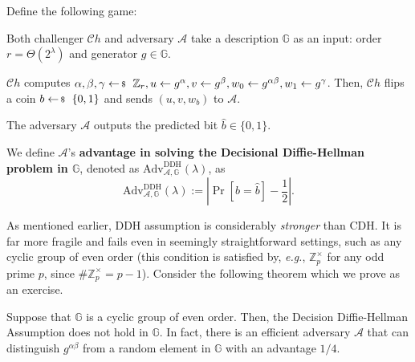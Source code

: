 \documentclass[../../book.tex]{subfiles}
\begin{document}
\begin{definition}
    Define the following game:
    \begin{algoen}
        \item Both challenger $\mathcal{C}h$ and adversary $\mathcal{A}$ take a description $\mathbb{G}$ as an input: order $r=\Theta(2^{\lambda})$ and generator $g \in \mathbb{G}$.
        \item $\mathcal{C}h$ computes $\alpha, \beta,\gamma \leftarrowS \mathbb{Z}_r, u \gets g^{\alpha}, v \gets g^{\beta}, w_0 \gets g^{\alpha\beta}, w_1 \gets g^{\gamma}$. Then, $\mathcal{C}h$ flips a coin $b \leftarrowS \{0,1\}$ and sends $(u,v,w_b)$ to $\mathcal{A}$.
        \item The adversary $\mathcal{A}$ outputs the predicted bit $\widehat{b} \in \{0,1\}$.
    \end{algoen}

    We define $\mathcal{A}$'s \textbf{advantage in solving the Decisional Diffie-Hellman problem in $\mathbb{G}$}, denoted as $\text{Adv}^{\text{DDH}}_{\mathcal{A},\mathbb{G}}(\lambda)$, as
    \begin{equation*}
        \text{Adv}^{\text{DDH}}_{\mathcal{A},\mathbb{G}}(\lambda) := \left| \Pr[b = \widehat{b}] - \frac{1}{2} \right|.
    \end{equation*}
\end{definition}

As mentioned earlier, DDH assumption is considerably \emph{stronger} than CDH.
It is far more fragile and fails even in seemingly straightforward settings, such as any cyclic group of even order (this condition is satisfied by, \textit{e.g.}, $\mathbb{Z}_p^{\times}$ for any odd prime $p$, since $\#\mathbb{Z}_p^{\times} = p-1$).
Consider the following theorem which we prove as an exercise.

\begin{theorem}
    Suppose that $\mathbb{G}$ is a cyclic group of even order. Then, the Decision
    Diffie-Hellman Assumption does not hold in $\mathbb{G}$. In fact, there is an efficient adversary $\mathcal{A}$ 
    that can distinguish $g^{\alpha\beta}$ from a random element in $\mathbb{G}$ with an advantage $1/4$.
\end{theorem}
\end{document}
